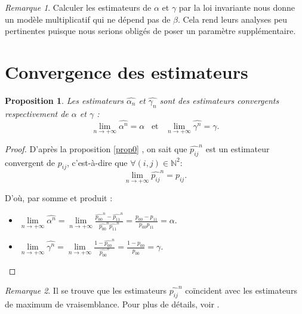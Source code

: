 \documentclass[12pt,a4paper]{report}
\newtheorem{prop}[thm]{Proposition}
\theoremstyle{remark}
\newtheorem*{remark}{Remarque}
\begin{document}
\begin{remark}
Calculer les estimateurs de $\alpha$ et $\gamma$ par la loi invariante nous donne un modèle multiplicatif qui ne dépend pas de $\beta$. Cela rend leurs analyses peu pertinentes puisque nous serions obligés de poser un paramètre supplémentaire.
\end{remark}

\section{Convergence des estimateurs}

\vspace{0.6cm}
\begin{prop}\label{prop_conv}
Les estimateurs $\hat{\alpha_n}$ et $\hat{\gamma_n}$ sont des estimateurs convergents respectivement de $\alpha$ et $\gamma$ :
$$\lim\limits_{n \to +\infty}\hat{\alpha^n} =\alpha \, \, \, \text{ et } \, \, \, \lim\limits_{n \to +\infty}\hat{\gamma^n} =\gamma.$$
\end{prop}

\begin{proof}
D'après la proposition \ref{prop0} , on sait que $\hat{p_{ij}}^n$ est un estimateur convergent de $p_{ij}$, c'est-à-dire que $\forall (i,j) \in \mathbb{N}^2$: 
$$\lim\limits_{n \to +\infty}\hat{p_{ij}}^n = p_{ij}.$$ 

D'où, par somme et produit : \\
\begin{itemize}
    \item $\lim\limits_{n \to +\infty}\hat{\alpha^n} =\lim\limits_{n \to +\infty}\frac{\hat{p_{00}}^n-\hat{p_{11}}^n}{\hat{p_{00}}^n\hat{p_{11}}^n} = \frac{p_{00}-p_{11}}{p_{00}p_{11}} = \alpha .$\\
    \item $\lim\limits_{n \to +\infty}\hat{\gamma^n} = \lim\limits_{n \to +\infty}\frac{1-\hat{p_{00}}^n}{\hat{p_{00}}^n} =\frac{1-p_{00}}{p_{00}}= \gamma .$
\end{itemize}
\end{proof}

\begin{remark}
Il se trouve que les estimateurs $\hat{p_{ij}}^n$ coïncident avec les estimateurs de maximum de vraisemblance. Pour plus de détails, voir \cite{cle4}.
\end{remark}
\end{document}

